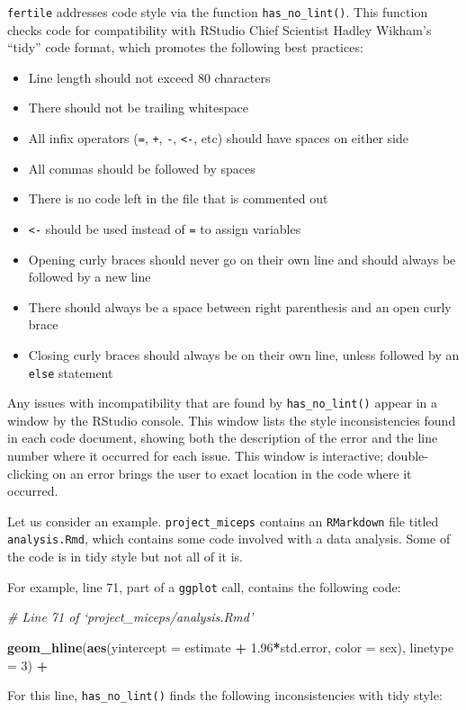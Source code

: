 \documentclass[12pt,twoside]{reedthesis}
\newenvironment{Shaded}{\begin{snugshade}}{\end{snugshade}}
\newcommand{\KeywordTok}[1]{\textcolor[rgb]{0.13,0.29,0.53}{\textbf{#1}}}
\newcommand{\DataTypeTok}[1]{\textcolor[rgb]{0.13,0.29,0.53}{#1}}
\newcommand{\DecValTok}[1]{\textcolor[rgb]{0.00,0.00,0.81}{#1}}
\newcommand{\FloatTok}[1]{\textcolor[rgb]{0.00,0.00,0.81}{#1}}
\newcommand{\StringTok}[1]{\textcolor[rgb]{0.31,0.60,0.02}{#1}}
\newcommand{\CommentTok}[1]{\textcolor[rgb]{0.56,0.35,0.01}{\textit{#1}}}
\newcommand{\OperatorTok}[1]{\textcolor[rgb]{0.81,0.36,0.00}{\textbf{#1}}}
\newcommand{\NormalTok}[1]{#1}
\providecommand{\tightlist}{%
  \setlength{\itemsep}{0pt}\setlength{\parskip}{0pt}}
\begin{document}
\texttt{fertile} addresses code style via the function
\texttt{has\_no\_lint()}. This function checks code for compatibility
with RStudio Chief Scientist Hadley Wikham's ``tidy'' code format, which
promotes the following best practices:
\begin{itemize}
\tightlist
\item
  Line length should not exceed 80 characters
\item
  There should not be trailing whitespace
\item
  All infix operators (\texttt{=}, \texttt{+}, \texttt{-},
  \texttt{\textless{}-}, etc) should have spaces on either side
\item
  All commas should be followed by spaces
\item
  There is no code left in the file that is commented out
\item
  \texttt{\textless{}-} should be used instead of \texttt{=} to assign
  variables
\item
  Opening curly braces should never go on their own line and should
  always be followed by a new line
\item
  There should always be a space between right parenthesis and an open
  curly brace
\item
  Closing curly braces should always be on their own line, unless
  followed by an \texttt{else} statement
\end{itemize}
Any issues with incompatibility that are found by
\texttt{has\_no\_lint()} appear in a window by the RStudio console. This
window lists the style inconsistencies found in each code document,
showing both the description of the error and the line number where it
occurred for each issue. This window is interactive; double-clicking on
an error brings the user to exact location in the code where it
occurred.

Let us consider an example. \texttt{project\_miceps} contains an
\texttt{RMarkdown} file titled \texttt{analysis.Rmd}, which contains
some code involved with a data analysis. Some of the code is in tidy
style but not all of it is.

For example, line 71, part of a \texttt{ggplot} call, contains the
following code:
\begin{Shaded}
\begin{Highlighting}[]
\CommentTok{# Line 71 of `project_miceps/analysis.Rmd'}

\KeywordTok{geom_hline}\NormalTok{(}\KeywordTok{aes}\NormalTok{(}\DataTypeTok{yintercept =}\NormalTok{ estimate }\OperatorTok{+}\StringTok{ }\FloatTok{1.96}\OperatorTok{*}\NormalTok{std.error, }\DataTypeTok{color =}\NormalTok{ sex), }\DataTypeTok{linetype =} \DecValTok{3}\NormalTok{) }\OperatorTok{+}\StringTok{ }
\end{Highlighting}
\end{Shaded}
For this line, \texttt{has\_no\_lint()} finds the following
inconsistencies with tidy style:
\end{document}
